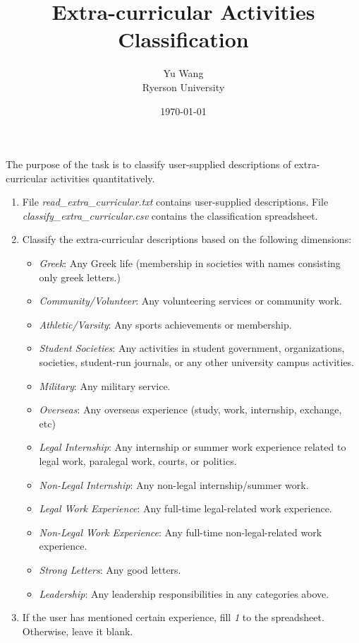 \documentclass[12pt]{article}
\begin{document}
\title{Extra-curricular Activities Classification} 
  
 \author{Yu Wang\\
 Ryerson University}

\date{\today}
\maketitle

The purpose of the task is to classify user-supplied descriptions of extra-curricular activities quantitatively. 

\begin{enumerate}
\item File {\itshape read\_extra\_curricular.txt} contains user-supplied descriptions. File {\itshape classify\_extra\_curricular.csv} contains the classification spreadsheet.
\item Classify the extra-curricular descriptions based on the following dimensions:
\begin{itemize}
\item {\itshape Greek}: Any Greek life (membership in societies with names consisting only greek letters.)
\item {\itshape Community/Volunteer}: Any volunteering services or community work.
\item {\itshape Athletic/Varsity}: Any sports achievements or membership.
\item {\itshape Student Societies}: Any activities in student government, organizations, societies, student-run journals, or any other university campus activities. 
\item {\itshape Military}: Any military service. 
\item {\itshape Overseas}: Any overseas experience (study, work, internship, exchange, etc)
\item {\itshape Legal Internship}: Any internship or summer work experience related to legal work, paralegal work, courts, or politics.
\item {\itshape Non-Legal Internship}: Any non-legal internship/summer work.
\item {\itshape Legal Work Experience}: Any full-time legal-related work experience.
\item {\itshape Non-Legal Work Experience}: Any full-time non-legal-related work experience.
\item {\itshape Strong Letters}: Any good letters.
\item {\itshape Leadership}: Any leadership responsibilities in any categories above.
\end{itemize}
\item If the user has mentioned certain experience, fill {\itshape 1} to the spreadsheet. Otherwise, leave it blank.
\end{enumerate}
\end{document}
